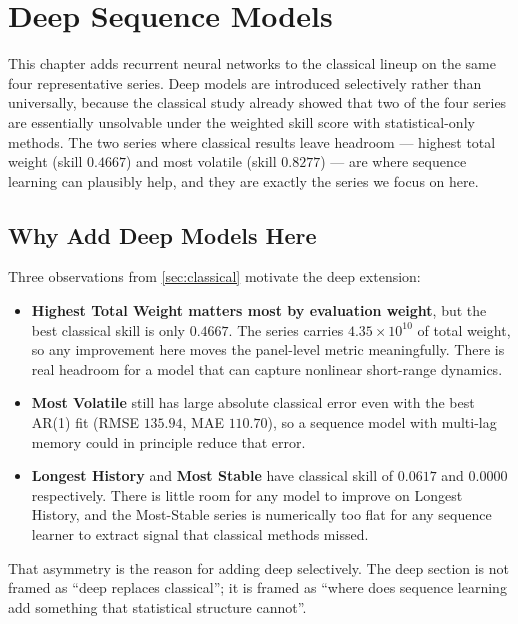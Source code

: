 \section{Deep Sequence Models}
\label{sec:deep}

This chapter adds recurrent neural networks to the classical lineup on the same four representative series. Deep models are introduced selectively rather than universally, because the classical study already showed that two of the four series are essentially unsolvable under the weighted skill score with statistical-only methods. The two series where classical results leave headroom --- highest total weight (skill $0.4667$) and most volatile (skill $0.8277$) --- are where sequence learning can plausibly help, and they are exactly the series we focus on here.

\subsection{Why Add Deep Models Here}
\label{sec:deep:motivation}

Three observations from \cref{sec:classical} motivate the deep extension:

\begin{itemize}
  \item \textbf{Highest Total Weight matters most by evaluation weight}, but the best classical skill is only $0.4667$. The series carries $4.35\!\times\!10^{10}$ of total weight, so any improvement here moves the panel-level metric meaningfully. There is real headroom for a model that can capture nonlinear short-range dynamics.
  \item \textbf{Most Volatile} still has large absolute classical error even with the best AR(1) fit (RMSE $135.94$, MAE $110.70$), so a sequence model with multi-lag memory could in principle reduce that error.
  \item \textbf{Longest History} and \textbf{Most Stable} have classical skill of $0.0617$ and $0.0000$ respectively. There is little room for any model to improve on Longest History, and the Most-Stable series is numerically too flat for any sequence learner to extract signal that classical methods missed.
\end{itemize}

That asymmetry is the reason for adding deep selectively. The deep section is not framed as ``deep replaces classical''; it is framed as ``where does sequence learning add something that statistical structure cannot''.

